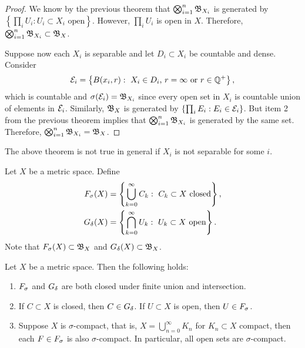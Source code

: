 \documentclass[a4paper]{article}
\renewcommand{\cupinfn}{\bigcup_{n=0}^\infty}
\renewcommand{\cupinfk}{\bigcup_{k=0}^\infty}
\renewcommand{\capinfk}{\bigcap_{k=0}^\infty}
\begin{document}
\begin{proof}
  We know by the previous theorem that
  $\bigotimes_{i=1}^n \mathfrak{B}_{X_i}$ is generated
  by $\left\{ \prod_i U_i : U_i \subset X_i \text{ open}
  \right\}$. However, $\prod_i U_i$ is open in $X$.
  Therefore, $\bigotimes_{i=1}^n \mathfrak{B}_{X_i} \subset \mathfrak{B}_X$.

  Suppose now each $X_i$ is separable and let $D_i \subset X_i$
  be countable and dense. Consider
  \[
  \mathcal{E}_i = \left\{ B(x_i, r): \text{ $X_i \in D_i$,
  $r = \infty$ or $r \in \mathbb{Q}^+$} \right\},
  \]
  which is countable and $\sigma(\mathcal{E}_i) = \mathfrak{B}_{X_i}$
  since every open set in $X_i$ is countable union of
  elements in $\mathcal{E}_i$. Similarly, $\mathfrak{B}_X$ is generated
  by $\left\{ \prod_i E_i : E_i \in \mathcal{E}_i \right\}$.
  But item 2 from the previous theorem
  implies that $\bigotimes_{i=1}^n \mathfrak{B}_{X_i}$
  is generated by the same set. Therefore,
  $\bigotimes_{i=1}^n \mathfrak{B}_{X_i} = \mathfrak{B}_X$.

\end{proof}

\begin{remark}
  The above theorem is not true in general
  if $X_i$ is not separable for some $i$.
\end{remark}

\begin{defi}
  Let $X$ be a metric space. Define
  \[
  \begin{aligned}
    \fs(X) &= \left\{ \cupinfk C_k : \text{ $C_k \subset X$
    closed} \right\}, \\
    \gd(X) &= \left\{ \capinfk U_k : \text{ $U_k \subset X$
    open} \right\}.
  \end{aligned}
  \]
  Note that $F_\sigma(X) \subset \mathfrak{B}_X$ and $G_\delta(X) \subset
  \mathfrak{B}_X$.
\end{defi}

\begin{thm}
  Let $X$ be a metric space. Then the following holds:
  \begin{enumerate}
    \item $F_\sigma$ and $G_\delta$ are both closed under finite
    union and intersection.
    \item If $C \subset X$ is closed, then $C \in G_\delta$.
    If $U \subset X$ is open, then $U \in F_\sigma$.
    \item Suppose $X$ is $\sigma$-compact, that is,
    $X = \cupinfn K_n$ for $K_n \subset X$ compact,
    then each $F \in F_\sigma$ is also $\sigma$-compact.
    In particular, all open sets are $\sigma$-compact.
  \end{enumerate}
\end{thm}
\end{document}
